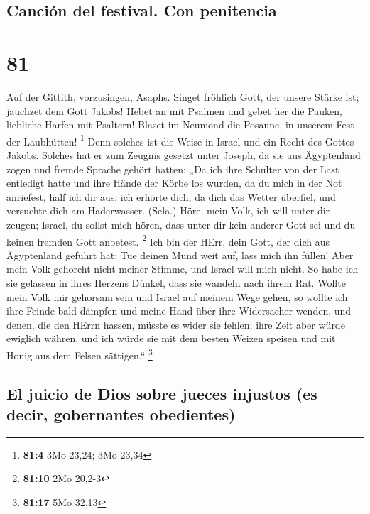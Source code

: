 \hypertarget{canciuxf3n-del-festival.-con-penitencia}{%
\subsection{Canción del festival. Con
penitencia}\label{canciuxf3n-del-festival.-con-penitencia}}

\hypertarget{section-80}{%
\section{81}\label{section-80}}

 Auf der Gittith, vorzusingen, Asaphs. 
Singet fröhlich Gott, der unsere Stärke ist; jauchzet dem Gott Jakobs!
 Hebet an mit Psalmen und gebet her die Pauken, liebliche
Harfen mit Psaltern!  Blaset im Neumond die Posaune, in
unserem Fest der Laubhütten! \footnote{\textbf{81:4} 3Mo 23,24; 3Mo
  23,34}  Denn solches ist die Weise in Israel und ein
Recht des Gottes Jakobs.  Solches hat er zum Zeugnis
gesetzt unter Joseph, da sie aus Ägyptenland zogen und fremde Sprache
gehört hatten:  „Da ich ihre Schulter von der Last
entledigt hatte und ihre Hände der Körbe los wurden,  da
du mich in der Not anriefest, half ich dir aus; ich erhörte dich, da
dich das Wetter überfiel, und versuchte dich am Haderwasser. (Sela.)
 Höre, mein Volk, ich will unter dir zeugen; Israel, du
sollst mich hören,  dass unter dir kein anderer Gott sei
und du keinen fremden Gott anbetest. \footnote{\textbf{81:10} 2Mo 20,2-3}
 Ich bin der HErr, dein Gott, der dich aus Ägyptenland
geführt hat: Tue deinen Mund weit auf, lass mich ihn füllen!
 Aber mein Volk gehorcht nicht meiner Stimme, und Israel
will mich nicht.  So habe ich sie gelassen in ihres
Herzens Dünkel, dass sie wandeln nach ihrem Rat.  Wollte
mein Volk mir gehorsam sein und Israel auf meinem Wege gehen,
 so wollte ich ihre Feinde bald dämpfen und meine Hand
über ihre Widersacher wenden,  und denen, die den HErrn
hassen, müsste es wider sie fehlen; ihre Zeit aber würde ewiglich
währen,  und ich würde sie mit dem besten Weizen speisen
und mit Honig aus dem Felsen sättigen.`` \footnote{\textbf{81:17} 5Mo
  32,13}

\hypertarget{el-juicio-de-dios-sobre-jueces-injustos-es-decir-gobernantes-obedientes}{%
\subsection{El juicio de Dios sobre jueces injustos (es decir,
gobernantes
obedientes)}\label{el-juicio-de-dios-sobre-jueces-injustos-es-decir-gobernantes-obedientes}}

